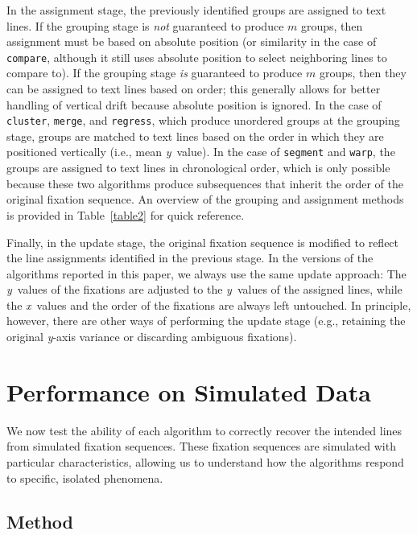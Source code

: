 \documentclass[doc,biblatex]{apa7}
\begin{document}
In the assignment stage, the previously identified groups are assigned to text lines. If the grouping stage is \textit{not} guaranteed to produce $m$ groups, then assignment must be based on absolute position (or similarity in the case of \texttt{compare}, although it still uses absolute position to select neighboring lines to compare to). If the grouping stage \textit{is} guaranteed to produce $m$ groups, then they can be assigned to text lines based on order; this generally allows for better handling of vertical drift because absolute position is ignored. In the case of \texttt{cluster}, \texttt{merge}, and \texttt{regress}, which produce unordered groups at the grouping stage, groups are matched to text lines based on the order in which they are positioned vertically (i.e., mean \textit{y}~value). In the case of \texttt{segment} and \texttt{warp}, the groups are assigned to text lines in chronological order, which is only possible because these two algorithms produce subsequences that inherit the order of the original fixation sequence. An overview of the grouping and assignment methods is provided in Table~\ref{table2} for quick reference.

Finally, in the update stage, the original fixation sequence is modified to reflect the line assignments identified in the previous stage. In the versions of the algorithms reported in this paper, we always use the same update approach: The \textit{y}~values of the fixations are adjusted to the \textit{y}~values of the assigned lines, while the \textit{x}~values and the order of the fixations are always left untouched. In principle, however, there are other ways of performing the update stage (e.g., retaining the original \textit{y}-axis variance or discarding ambiguous fixations).

\section{Performance on Simulated Data}

We now test the ability of each algorithm to correctly recover the intended lines from simulated fixation sequences. These fixation sequences are simulated with particular characteristics, allowing us to understand how the algorithms respond to specific, isolated phenomena.

\subsection{Method}
\end{document}
